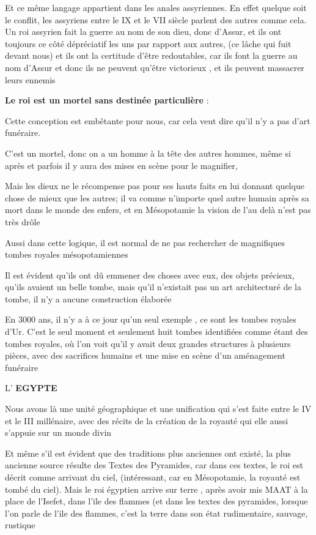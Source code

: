 \documentclass[a4paper,10pt]{article}
\begin{document}
Et ce même langage appartient dans les anales assyriennes. En effet
quelque soit le conflit, les assyriens entre le IX et le VII siècle
parlent des autres comme cela. Un roi assyrien fait la guerre au nom de
son dieu, donc d'Assur, et ils ont toujours ce côté
dépréciatif les uns par rapport aux autres, (ce lâche qui fuit devant
nous) et ils ont la certitude d'être redoutables, car
ils font la guerre au nom d'Assur et donc ils ne
peuvent qu'être victorieux , et ils peuvent massacrer
leurs ennemis

\textbf{Le roi est un mortel sans destinée particulière} : 

Cette conception est embêtante pour nous, car cela veut dire
qu'il n'y a pas
d'art funéraire.

C'est un mortel, donc on a un homme à la tête des
autres hommes, même si après et parfois il y aura des mises en scène
pour le magnifier,  

Mais les dieux ne le récompense pas pour ses hauts faits en lui donnant
quelque chose de mieux que les autres; il va comme
n'importe quel autre humain après sa mort dans le
monde des enfers, et en Mésopotamie la vision de l'au
delà n'est pas très drôle

Aussi dans cette logique, il est normal de ne pas rechercher de
magnifiques tombes royales mésopotamiennes

Il est évident qu'ils ont dû emmener des choses avec
eux,  des objets précieux, qu'ils avaient un belle
tombe, mais qu'il n'existait pas un
art architecturé de la tombe, il n'y a aucune
construction élaborée

En 3000 ans,  il n'y a  à ce jour
qu'un seul exemple , ce sont les tombes royales
d'Ur. C'est le seul moment et
seulement huit tombes identifiées comme étant des tombes royales, où
l'on voit qu'il y avait deux grandes
structures à plusieurs pièces, avec des sacrifices humains et une mise
en scène d'un aménagement funéraire

 L'\textbf{ EGYPTE}

Nous avons là une unité géographique et une unification qui
s'est faite entre le IV et le III millénaire, avec des
récits de la création de la royauté qui elle aussi
s'appuie sur un monde divin

Et même s'il est évident que des traditions plus
anciennes ont existé, la plus ancienne source résulte des Textes des
Pyramides, car dans ces textes, le roi est décrit comme arrivant du
ciel, (intéressant, car en Mésopotamie, la royauté est tombé du ciel).
Mais le roi égyptien arrive sur terre , après avoir mis MAAT à la place
de l'Isefet, dans l'ile des flammes
(et dans les textes des pyramides, lorsque l'on parle
de l'ile des flammes, c'est la terre
dans son état rudimentaire, sauvage, rustique
\end{document}
